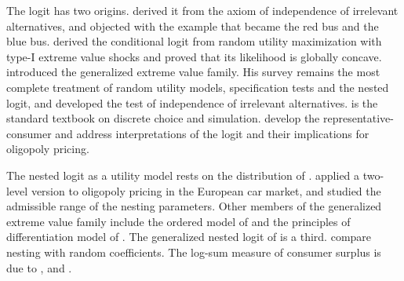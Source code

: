 The logit has two origins. \citet{Luce1959} derived it from the axiom of independence of irrelevant alternatives,
and \citet{Debreu1960} objected with the example that became the red bus and the blue bus. \citet{McFadden1974}
derived the conditional logit from random utility maximization with type-I extreme value shocks and proved that
its likelihood is globally concave. \citet{McFadden1978} introduced the generalized extreme value family. His survey
\citep{McFadden1984} remains the most complete treatment of random utility models, specification tests and the
nested logit, and \citet{HausmanMcFadden1984} developed the test of independence of irrelevant alternatives.
\citet{Train2009} is the standard textbook on discrete choice and simulation. \citet{AndersonDePalmaThisse1992}
develop the representative-consumer and address interpretations of the logit and their implications for oligopoly
pricing.

The nested logit as a utility model rests on the distribution of \citet{Cardell1997}. \citet{Verboven1996}
applied a two-level version to oligopoly pricing in the European car market, and \citet{BorschSupan1990} studied
the admissible range of the nesting parameters. Other members of the generalized extreme value family include the
ordered model of \citet{Small1987} and the principles of differentiation model of
\citet{BresnahanSternTrajtenberg1997}. The generalized nested logit of \citet{WenKoppelman2001} is a third.
\citet{GrigolonVerboven2014} compare nesting with random coefficients.
The log-sum measure of consumer surplus is due to \citet{Williams1977}, \citet{SmallRosen1981} and
\citet{McFadden1981}.


